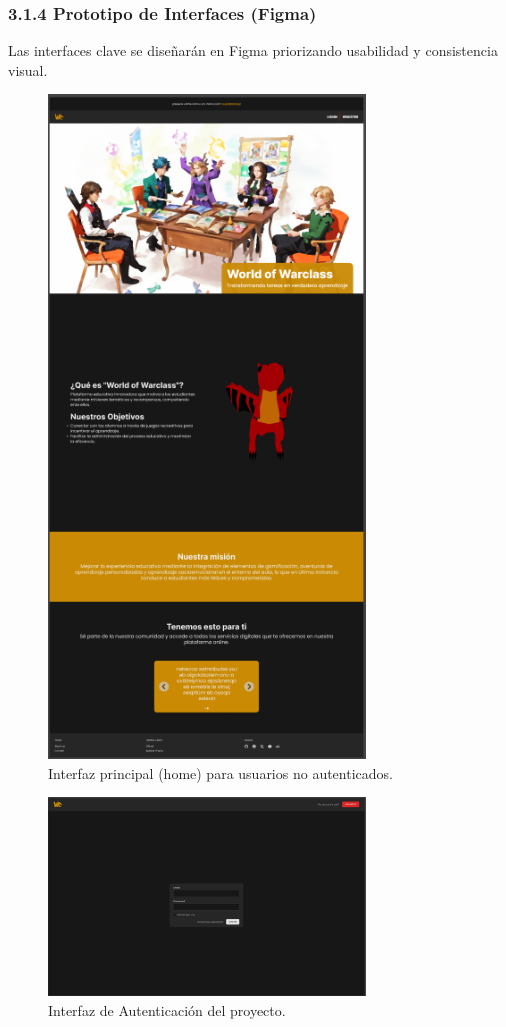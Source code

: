 \subsubsection{3.1.4 Prototipo de Interfaces (Figma)}
Las interfaces clave se diseñarán en Figma priorizando usabilidad y consistencia visual.
\begin{figure}[H]
	\centering
	\includegraphics[width=0.75\textwidth]{images/pagina_web_inicio.png}
	\caption{Interfaz principal (home) para usuarios no autenticados.}
	\label{fig:ui-home}
\end{figure}
\begin{figure}[H]
	\centering
	\includegraphics[width=0.75\textwidth]{images/pagina_web_iniciar-sesion.png}
	\caption{Interfaz de Autenticación del proyecto.}
	\label{fig:ui-login}
\end{figure}
